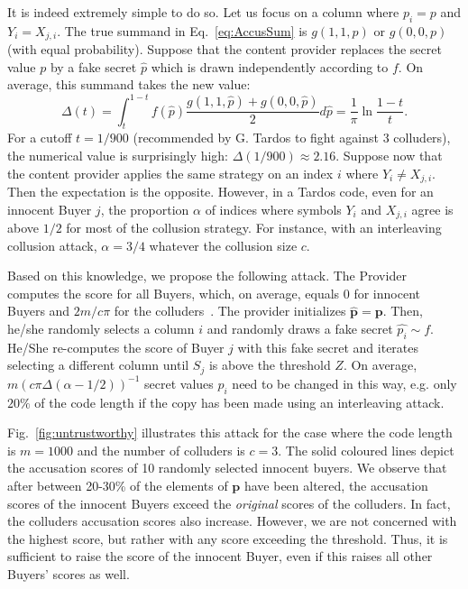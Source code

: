 \documentclass{article}
\begin{document}
It is indeed extremely simple to do so. Let us focus on a column where
$p_{i}=p$ and $Y_{i}=X_{j,i}$. The true summand in
Eq.~\eqref{eq:AccusSum} is $g(1,1,p)$ or $g(0,0,p)$ (with equal
probability).  Suppose that the content provider replaces the secret
value $p$ by a fake secret $\hat{p}$ which is drawn independently
according to $f$. On average, this summand takes the new value:
$$
\Delta(t) = \int_{t}^{1-t}f(\hat{p})\frac{g(1,1,\hat{p})+g(0,0,\hat{p})}{2}d\hat{p}=\frac{1}{\pi}\ln\frac{1-t}{t}.
$$
For a cutoff $t=1/900$ (recommended by G. Tardos to fight against 3
colluders), the numerical value is surprisingly high:
$\Delta(1/900)\approx 2.16$.  Suppose now that the content provider
applies the same strategy on an index $i$ where $Y_{i}\neq
X_{j,i}$. Then the expectation is the opposite. However, in a Tardos code, even for an innocent Buyer $j$, the proportion
$\alpha$ of indices where symbols $Y_{i}$ and $X_{j,i}$ agree is above
$1/2$ for most of the collusion strategy.
For instance, with an interleaving collusion attack, $\alpha=3/4$ whatever the collusion size $c$.

Based on this knowledge, we propose the following attack. The Provider computes the score for
all Buyers, which, on average, equals 0 for innocent Buyers and
$2m/c\pi$ for the colluders~\cite{SkoricSymmetric}. The provider initializes
$\hat{\mathbf{p}}=\mathbf{p}$. Then, he/she randomly selects a column $i$
and randomly draws a fake secret $\hat{p_{i}}\sim f$. He/She re-computes
the score of Buyer $j$ with this fake secret and iterates selecting a
different column until $S_{j}$ is above the threshold $Z$.
On average, $m(c\pi\Delta(\alpha-1/2))^{-1}$ secret values $p_i$ need
to be changed in this way, e.g. only $20\%$ of the code length if the
copy has been made using an interleaving attack.

Fig.~\ref{fig:untrustworthy} illustrates this attack for the case
where the code length is $m=1000$ and the
number of colluders is $c=3$.  The
solid coloured lines depict the accusation scores of 10 randomly selected innocent
buyers.  We observe that after between 20-30\% of the elements of $\mathbf{p}$
have been altered, the accusation scores of the innocent
Buyers exceed the {\em original} scores of the colluders.  In fact,
the colluders accusation scores also increase.  However, we are not
concerned with the highest score, but rather with any score
exceeding the threshold.  Thus, it is sufficient to raise the score of the
innocent Buyer, even if this raises all other Buyers' scores as well.
\end{document}
